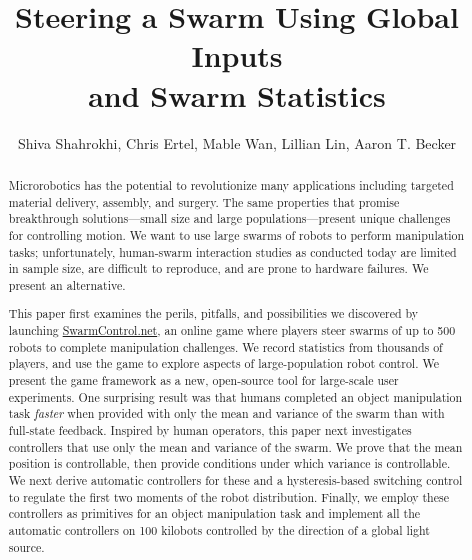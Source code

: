 \documentclass[Afour,sageh,times]{sagej} %
\begin{document}
\setcounter{secnumdepth}{3}
 

\title{\LARGE \bf Steering a Swarm Using Global Inputs\\ and Swarm Statistics}


\author{Shiva Shahrokhi, Chris Ertel, Mable Wan, Lillian Lin, Aaron T. Becker}%


\begin{abstract}
Microrobotics has the potential to revolutionize many applications including targeted material delivery, assembly, and surgery.  The same properties that promise breakthrough solutions---small size and large populations---present unique challenges for controlling motion. We want to use large swarms of robots to perform manipulation tasks; unfortunately, human-swarm interaction studies as conducted today are limited in sample size, are difficult to reproduce, and are prone to hardware failures. We present an alternative.

This paper first examines the perils, pitfalls, and possibilities we discovered by launching \href{http://www.swarmcontrol.net}{SwarmControl.net}, an online game where players steer swarms of up to 500 robots to complete manipulation challenges. We record statistics from thousands of players, and use the game to explore aspects of large-population robot control. We present the game framework as a new, open-source tool for large-scale user experiments. One surprising result was that humans completed an object manipulation task \emph{faster} when provided with only the mean and variance of the swarm than with full-state feedback. Inspired by human operators, this paper next investigates controllers that use only the mean and variance of the swarm. We prove that the mean position is controllable, then provide conditions under which variance is controllable.  We next derive automatic controllers for these and a hysteresis-based switching control to regulate the first two moments of the robot distribution.  Finally, we employ these controllers as primitives for an object manipulation task and implement all the automatic controllers on 100 kilobots controlled by the direction of a global light source.
\end{abstract}
\end{document}
